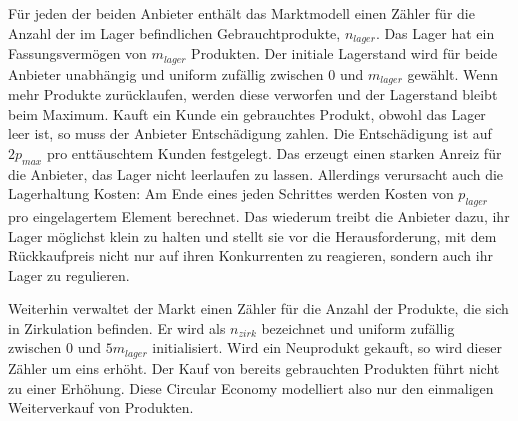 Für jeden der beiden Anbieter enthält das Marktmodell einen Zähler für die Anzahl der im Lager befindlichen Gebrauchtprodukte, $n_{lager}$.
Das Lager hat ein Fassungsvermögen von $m_{lager}$ Produkten.
Der initiale Lagerstand wird für beide Anbieter unabhängig und uniform zufällig zwischen $0$ und $m_{lager}$ gewählt.
Wenn mehr Produkte zurücklaufen, werden diese verworfen und der Lagerstand bleibt beim Maximum.
Kauft ein Kunde ein gebrauchtes Produkt, obwohl das Lager leer ist, so muss der Anbieter Entschädigung zahlen.
Die Entschädigung ist auf $2 p_{max}$ pro enttäuschtem Kunden festgelegt.
Das erzeugt einen starken Anreiz für die Anbieter, das Lager nicht leerlaufen zu lassen.
Allerdings verursacht auch die Lagerhaltung Kosten: Am Ende eines jeden Schrittes werden Kosten von $p_{lager}$ pro eingelagertem Element berechnet.
Das wiederum treibt die Anbieter dazu, ihr Lager möglichst klein zu halten und stellt sie vor die Herausforderung, mit dem Rückkaufpreis nicht nur auf ihren Konkurrenten zu reagieren, sondern auch ihr Lager zu regulieren.

Weiterhin verwaltet der Markt einen Zähler für die Anzahl der Produkte, die sich in Zirkulation befinden.
Er wird als $n_{zirk}$ bezeichnet und uniform zufällig zwischen $0$ und $5 m_{lager}$ initialisiert.
Wird ein Neuprodukt gekauft, so wird dieser Zähler um eins erhöht.
Der Kauf von bereits gebrauchten Produkten führt nicht zu einer Erhöhung.
Diese Circular Economy modelliert also nur den einmaligen Weiterverkauf von Produkten.


